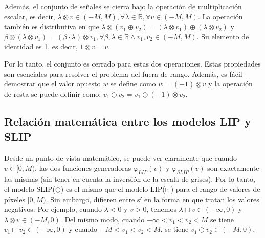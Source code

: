Además, el conjunto de señales se cierra bajo la operación de multiplicación escalar, es decir, $\lambda \otimes v \in (-M, M), \forall \lambda \in \mathbb{R}, \forall v \in (-M, M)$. La operación también es distributiva en que $\lambda \otimes (v_1\oplus v_2) = (\lambda \otimes v_1 )\oplus (\lambda\otimes v_2)$ y $\beta\otimes (\lambda\otimes v_1 ) = (\beta \cdot \lambda)\otimes v_1, \forall \beta, \lambda \in \mathbb{R} \land v_1 , v_2 \in (-M, M)$. Su elemento de identidad es 1, es decir, $1\otimes v = v $.

Por lo tanto, el conjunto es cerrado para estas dos operaciones. Estas propiedades son esenciales para resolver el problema del fuera de rango. Además, es fácil demostrar que el valor opuesto $w$ se define como $w = (-1)\otimes v$ y la operación de resta se puede definir como: $v_1\ominus v_2=v_1\oplus(-1)\otimes v_2$.

\subsection{Relación matemática entre los modelos LIP y SLIP}

Desde un punto de vista matemático, se puede ver claramente que cuando $v \in [0, M)$, las dos funciones generadoras $\varphi_{LIP}(v)$ y $\varphi_{SLIP}(v)$ son exactamente las mismas (sin tener en cuenta la inversi\'on de la escala de grises). Por lo tanto, el modelo SLIP($\odot$) es el mismo que el modelo LIP($\boxdot$) para el rango de valores de píxeles $[0, M)$. Sin embargo, difieren entre sí en la forma en que tratan los valores negativos.  Por ejemplo, cuando $\lambda < 0$ y $v > 0$, tenemos $\lambda\boxminus v \in (-\infty, 0)$ y $\lambda \otimes v \in (-M, 0)$. Del mismo modo, cuando $-\infty < v_1 < v_2 < M$ se tiene $v_1 \boxminus v_2 \in (-\infty, 0)$ y cuando $-M < v_1 < v_2 < M$, se tiene $v_1\ominus v_2 \in (-M, 0)$. 
